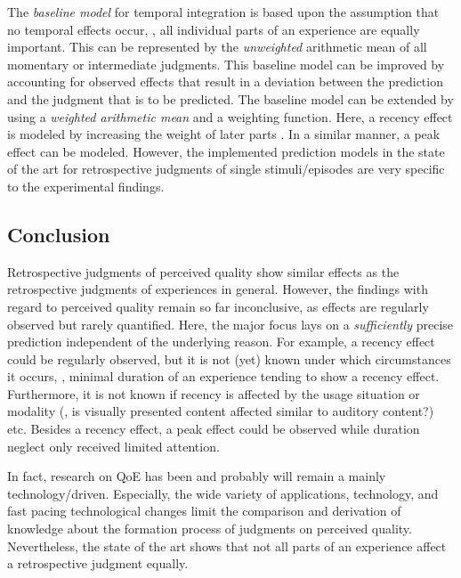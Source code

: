The \emph{baseline model} for temporal integration is based upon the assumption that no temporal effects occur, \ie, all individual parts of an experience are equally important.
This can be represented by the \emph{unweighted} arithmetic mean of all momentary or intermediate judgments.
This baseline model can be improved by accounting for observed effects that result in a deviation between the prediction and the judgment that is to be predicted.
The baseline model can be extended by using a \emph{weighted arithmetic mean} and a weighting function.
Here, a recency effect is modeled by increasing the weight of later parts \citep[][]{rosenbluth_testing_1998, weiss_modeling_2009, hamberg_time-varying_1999}.
In a similar manner, a peak effect can be modeled.
However, the implemented prediction models in the state of the art for retrospective judgments of single stimuli/episodes are very specific to the experimental findings.

\subsection{Conclusion}
Retrospective judgments of perceived quality show similar effects as the retrospective judgments of experiences in general.
However, the findings with regard to perceived quality remain so far inconclusive, as effects are regularly observed but rarely quantified.
Here, the major focus lays on a \emph{sufficiently} precise prediction independent of the underlying reason.
For example, a recency effect could be regularly observed, but it is not (yet) known under which circumstances it occurs, \eg, minimal duration of an experience tending to show a recency effect.
Furthermore, it is not known if recency is affected by the usage situation or modality (\eg, is visually presented content affected similar to auditory content?) etc.
Besides a recency effect, a peak effect could be observed while duration neglect only received limited attention.

In fact, research on \ac{QoE} has been and probably will remain a mainly technology\-/driven.
Especially, the wide variety of applications, technology, and fast pacing technological changes limit the comparison and derivation of knowledge about the formation process of judgments on perceived quality.
Nevertheless, the state of the art shows that not all parts of an experience affect a retrospective judgment equally.
